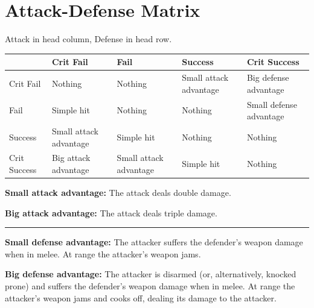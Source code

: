 \section{Attack-Defense Matrix} %
\label{attack-defense-matrix}

Attack in head column, Defense in head row.
\par
\begin{tabularx}{\textwidth}{l|XXXX}
	& Crit Fail & Fail & Success & Crit Success \\
	\hline
	Crit Fail & Nothing & Nothing & Small attack advantage & Big defense advantage \\
	Fail & Simple hit & Nothing & Nothing & Small defense advantage \\
	Success & Small attack advantage & Simple hit & Nothing & Nothing \\
	Crit Success & Big attack advantage & Small attack advantage & Simple hit & Nothing
\end{tabularx}


\begin{sitemize}
\item \textbf{Small attack advantage:}
	The attack deals double damage.
\item \textbf{Big attack advantage:}
	The attack deals triple damage.
\vspace{1mm}
\hrule
\vspace{1mm}
\item \textbf{Small defense advantage:}
	The attacker suffers the defender's weapon damage when in melee.
	At range the attacker's weapon jams.
\item \textbf{Big defense advantage:}
	The attacker is disarmed (or, alternatively, knocked prone) and suffers the defender's weapon damage when in melee.
	At range the attacker's weapon jams and cooks off, dealing its damage to the attacker.
\end{sitemize}
